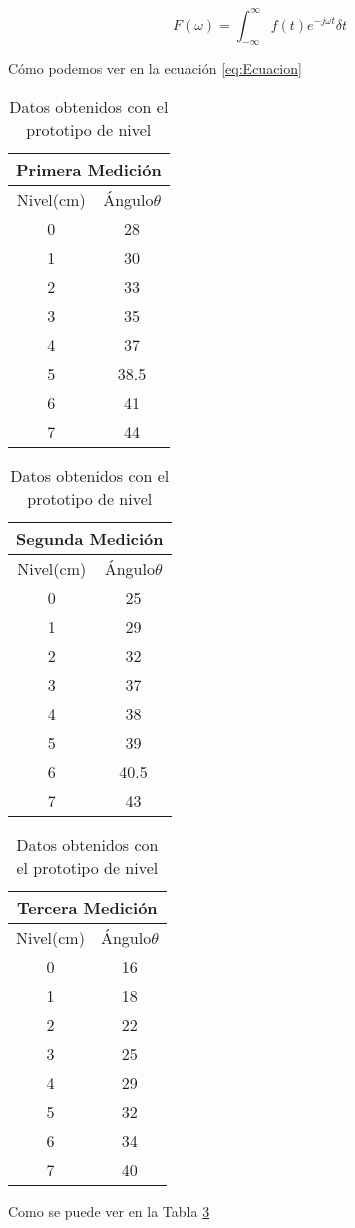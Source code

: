\documentclass{article}
\begin{document}
	\renewcommand{\tablename}{Tabla}
	\begin{equation}
		F(\omega)=\int^\infty_{-\infty}{f(t)e^{-j\omega t}\delta t}
		\label{eq:Ecuacion}
	\end{equation}
	
	Cómo podemos ver en la ecuación \eqref{eq:Ecuacion} 
	
	\begin{table}[h]
		\centering
		\begin{tabular}{|c|c|}
			\hline
			\multicolumn{2}{|c|}{Primera Medición}
			\\\hline
			Nivel(cm)&Ángulo$\theta$\\\hline
			0&28\\\hline
			1&30\\\hline
			2&33\\\hline
			3&35\\\hline
			4&37\\\hline
			5&38.5\\\hline
			6&41\\\hline
			7&44\\\hline
		\end{tabular}
		\hspace{1cm}
		\begin{tabular}{|c|c|}
			\hline
			\multicolumn{2}{|c|}{Segunda Medición}
			\\\hline
			Nivel(cm)&Ángulo$\theta$\\\hline
			0&25\\\hline
			1&29\\\hline
			2&32\\\hline
			3&37\\\hline
			4&38\\\hline
			5&39\\\hline
			6&40.5\\\hline
			7&43\\\hline
		\end{tabular}
		\hspace{1.5cm}
		\begin{tabular}{|c|c|}
			\hline
			\multicolumn{2}{|c|}{Tercera Medición}
			\\\hline
			Nivel(cm)&Ángulo$\theta$\\\hline
			0&16\\\hline
			1&18\\\hline
			2&22\\\hline
			3&25\\\hline
			4&29\\\hline
			5&32\\\hline
			6&34\\\hline
			7&40\\\hline
		\end{tabular}
		\caption{Datos obtenidos con el prototipo de nivel}
		\label{Tab:DPN}
	\end{table}

Como se puede ver en la Tabla \ref{Tab:DPN}
\end{document}
